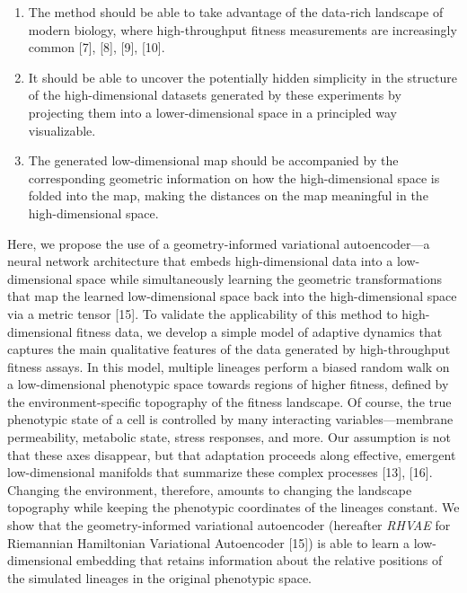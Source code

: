 \documentclass[
]{scrartcl}
\begin{document}
\begin{refsegment}
\begin{enumerate}
\def\labelenumi{\arabic{enumi}.}
\item
  The method should be able to take advantage of the data-rich landscape
  of modern biology, where high-throughput fitness measurements are
  increasingly common {[}7{]}, {[}8{]}, {[}9{]}, {[}10{]}.
\item
  It should be able to uncover the potentially hidden simplicity in the
  structure of the high-dimensional datasets generated by these
  experiments by projecting them into a lower-dimensional space in a
  principled way visualizable.
\item
  The generated low-dimensional map should be accompanied by the
  corresponding geometric information on how the high-dimensional space
  is folded into the map, making the distances on the map meaningful in
  the high-dimensional space.
\end{enumerate}

Here, we propose the use of a geometry-informed variational
autoencoder---a neural network architecture that embeds high-dimensional
data into a low-dimensional space while simultaneously learning the
geometric transformations that map the learned low-dimensional space
back into the high-dimensional space via a metric tensor {[}15{]}. To
validate the applicability of this method to high-dimensional fitness
data, we develop a simple model of adaptive dynamics that captures the
main qualitative features of the data generated by high-throughput
fitness assays. In this model, multiple lineages perform a biased random
walk on a low-dimensional phenotypic space towards regions of higher
fitness, defined by the environment-specific topography of the fitness
landscape. \textcolor{tempcolor}{
Of course, the true phenotypic state of a cell is controlled by many
interacting variables---membrane permeability, metabolic state, stress
responses, and more. Our assumption is not that these axes disappear,
but that adaptation proceeds along effective, emergent low-dimensional
manifolds that summarize these complex processes {[}13{]}, {[}16{]}. }
Changing the environment, therefore, amounts to changing the landscape
topography while keeping the phenotypic coordinates of the lineages
constant. We show that the geometry-informed variational autoencoder
(hereafter \emph{RHVAE} for Riemannian Hamiltonian Variational
Autoencoder {[}15{]}) is able to learn a low-dimensional embedding that
retains information about the relative positions of the simulated
lineages in the original phenotypic space.


\end{refsegment}
\end{document}
